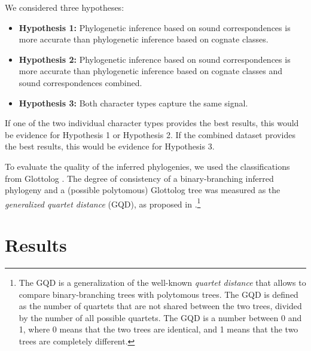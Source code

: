 \documentclass[10pt, a4paper]{article}
\begin{document}
We considered three hypotheses:

\begin{itemize}
  \item \textbf{Hypothesis 1:} Phylogenetic inference based on sound correspondences is more accurate than phylogenetic inference based on cognate classes.
  \item \textbf{Hypothesis 2:} Phylogenetic inference based on sound correspondences is more accurate than phylogenetic inference based on cognate classes and sound correspondences combined.
  \item \textbf{Hypothesis 3:} Both character types capture the same signal.
\end{itemize}

If one of the two individual character types provides the best results, this would be evidence for Hypothesis 1 or Hypothesis 2. If the combined dataset provides the best results, this would be evidence for Hypothesis 3.


To evaluate the quality of the inferred phylogenies, we used the classifications from Glottolog \citep{Glottolog}. The degree of consistency of a binary-branching inferred phylogeny and a (possible polytomous) Glottolog tree was measured as the \emph{generalized quartet distance} (GQD), as proposed in \citep{pompei2011accuracy}.\footnote{The GQD is a generalization of the well-known \emph{quartet distance} \citep{estabrook1985comparison} that allows to compare binary-branching trees with polytomous trees. The GQD is defined as the number of quartets that are not shared between the two trees, divided by the number of all possible quartets. The GQD is a number between 0 and 1, where 0 means that the two trees are identical, and 1 means that the two trees are completely different.}

\section{Results}
\end{document}
